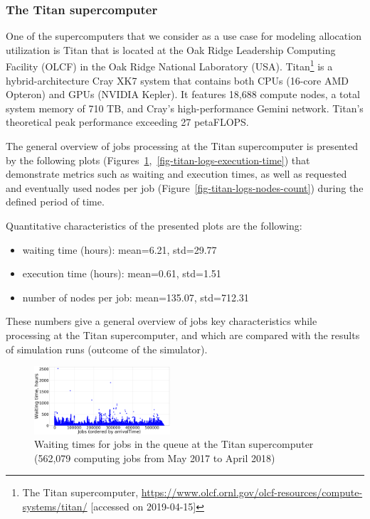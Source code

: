 \subsubsection{The Titan supercomputer}
\label{sec-experiments-1-1}

One of the supercomputers that we consider as a use case for modeling allocation utilization is Titan that is located at the Oak Ridge Leadership Computing Facility (OLCF) in the Oak Ridge National Laboratory (USA). Titan\footnote{The Titan supercomputer, \url{https://www.olcf.ornl.gov/olcf-resources/compute-systems/titan/} [accessed on 2019-04-15]} is a hybrid-architecture Cray XK7 system that contains both CPUs (16-core AMD Opteron) and GPUs (NVIDIA Kepler). It features 18,688 compute nodes, a total system memory of 710 TB, and Cray's high-performance Gemini network. Titan's theoretical peak performance exceeding 27 petaFLOPS.

The general overview of jobs processing at the Titan supercomputer is presented by the following plots (Figures~\ref{fig-titan-logs-waiting-time},~\ref{fig-titan-logs-execution-time}) that demonstrate metrics such as waiting and execution times, as well as requested and eventually used nodes per job (Figure~\ref{fig-titan-logs-nodes-count}) during the defined period of time.

Quantitative characteristics of the presented plots are the following:
\begin{itemize}
    \item waiting time (hours): mean=6.21, std=29.77
    \item execution time (hours): mean=0.61, std=1.51
    \item number of nodes per job: mean=135.07, std=712.31
\end{itemize}
These numbers give a general overview of jobs key characteristics while processing at the Titan supercomputer, and which are compared with the results of simulation runs (outcome of the simulator).

\begin{figure}
    \centering
    \includegraphics[width=0.45\textwidth]{pics/titan-logs-waiting-time.png}
    \caption{Waiting times for jobs in the queue at the Titan supercomputer (562,079 computing jobs from May 2017 to April 2018)}
    \label{fig-titan-logs-waiting-time} 
\end{figure}

